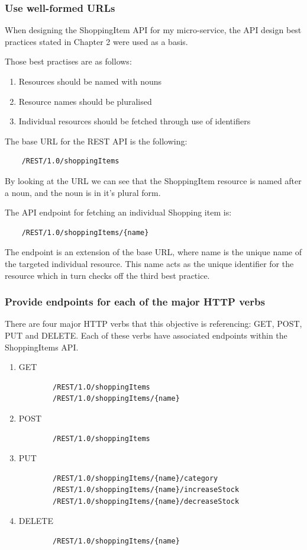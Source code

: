 \subsubsection{Use well-formed URLs}
When designing the ShoppingItem API for my micro-service, the API design best practices stated in Chapter 2 were used as a basis.

Those best practises are as follows:
\begin{enumerate}
    \item Resources should be named with nouns
    \item Resource names should be pluralised
    \item Individual resources should be fetched through use of identifiers
\end{enumerate}
The base URL for the REST API is the following:
\begin{verbatim}
    /REST/1.0/shoppingItems
\end{verbatim}
By looking at the URL we can see that the ShoppingItem resource is named after a noun, and the noun is in it's plural form.

The API endpoint for fetching an individual Shopping item is:
\begin{verbatim}
    /REST/1.0/shoppingItems/{name}
\end{verbatim}
The endpoint is an extension of the base URL, where {name} is the unique name of the targeted individual resource. This name acts as the unique identifier for the resource which in turn checks off the third best practice.
\subsubsection{Provide endpoints for each of the major HTTP verbs}
There are four major HTTP verbs that this objective is referencing: GET, POST, PUT and DELETE. Each of these verbs have associated endpoints within the ShoppingItems API.
\begin{enumerate}
    \item GET
    \begin{verbatim}
        /REST/1.O/shoppingItems
        /REST/1.0/shoppingItems/{name}
    \end{verbatim}
    \item POST
    \begin{verbatim}
        /REST/1.0/shoppingItems
    \end{verbatim}
    \item PUT
    \begin{verbatim}
        /REST/1.0/shoppingItems/{name}/category
        /REST/1.0/shoppingItems/{name}/increaseStock
        /REST/1.0/shoppingItems/{name}/decreaseStock
    \end{verbatim}
    \item DELETE
    \begin{verbatim}
        /REST/1.0/shoppingItems/{name}
    \end{verbatim}
\end{enumerate}

